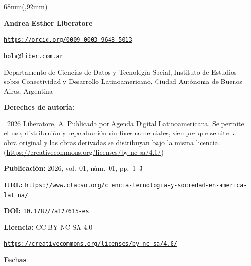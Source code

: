 \begin{textblock*}{68mm}(\gbbloquex,92mm)
{\setlength{\leftskip}{0pt}\setlength{\parindent}{0pt}%
\noindent\begin{minipage}[t]{68mm}
\sffamily\small\setlength{\parskip}{1pt}
{\bfseries\color{azulrevista}Andrea Esther Liberatore}\par
{\scriptsize\texttt{\href{https://orcid.org/0009-0003-9648-5013}{https://orcid.org/0009-0003-9648-5013}}}\par
{\scriptsize\texttt{\href{mailto:hola@liber.com.ar}{hola@liber.com.ar}}}\par
Departamento de Ciencias de Datos y Tecnología Social, Instituto de Estudios sobre Conectividad y Desarrollo Latinoamericano, Ciudad Autónoma de Buenos Aires, Argentina\par
\vspace{6pt}
{\bfseries\color{azulrevista!70}Derechos de autor\'ia:}\par
\textcopyright\ 2026 Liberatore, A. Publicado por Agenda Digital Latinoamericana. Se permite el uso, distribución y reproducción sin fines comerciales, siempre que se cite la obra original y las obras derivadas se distribuyan bajo la misma licencia. (\href{https://creativecommons.org/licenses/by-nc-sa/4.0/}{https://creativecommons.org/licenses/by-nc-sa/4.0/})\par\vspace{6pt}
{\bfseries\color{azulrevista!70}Publicación:} 2026, vol.~01, n\'um.~01, pp.~1--3\par\vspace{6pt}
{\bfseries\color{azulrevista!70}URL:} {\scriptsize\texttt{\href{https://www.clacso.org/ciencia-tecnologia-y-sociedad-en-america-latina/}{https://www.clacso.org/ciencia-tecnologia-y-sociedad-en-america-latina/}}}\par\vspace{6pt}
{\bfseries\color{azulrevista!70}DOI:} {\scriptsize\texttt{\href{https://doi.org/10.1787/7a127615-es}{10.1787/7a127615-es}}}\par\vspace{6pt}
{\bfseries\color{azulrevista!70}Licencia:} CC BY-NC-SA 4.0\par
{\scriptsize\texttt{\href{https://creativecommons.org/licenses/by-nc-sa/4.0/}{https://creativecommons.org/licenses/by-nc-sa/4.0/}}}\par
\vspace{6pt}
{\bfseries\color{azulrevista!70}Fechas}\par\vspace{2pt}

\end{minipage}}
\end{textblock*}
